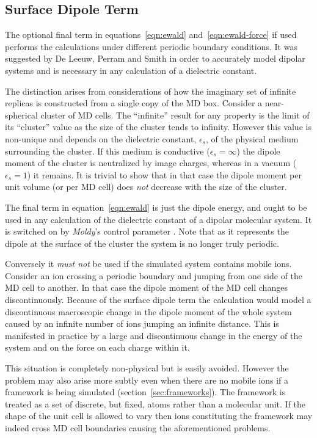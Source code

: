 \documentclass[a4paper,twoside]{report}
\newcommand{\moldy}{\emph{Moldy}}
\begin{document}
\subsection{Surface Dipole Term}
The optional final term in equations~\ref{eqn:ewald} 
and~\ref{eqn:ewald-force} if used performs the calculations under
different periodic boundary conditions.  It was suggested by De Leeuw,
Perram and Smith\cite{deleeuw:80} in order to accurately model
dipolar systems and is necessary in any calculation of a dielectric
constant. 

The distinction arises from considerations of how the imaginary set of
infinite replicas is constructed from a single copy of the MD 
box\cite[pp 156-159]{allen:87}.  Consider a near-spherical cluster
of MD cells.  The ``infinite'' result for any property is the limit of
its ``cluster'' value as the size of the cluster tends to infinity.
However this value is non-unique and depends on the dielectric
constant, $\epsilon_s$, of the physical medium surrounding the cluster.
If this medium is conductive ($\epsilon_s=\infty$) the dipole
moment of the cluster is neutralized by image charges, whereas in a
vacuum ($\epsilon_s=1$) it remains.  It is trivial to show that
in that case the dipole moment per unit volume (or per MD cell) does
\emph{not} decrease with the size of the cluster.

The final term in equation~\ref{eqn:ewald} is just the dipole energy,
and ought to be used in any calculation of the dielectric constant of
a dipolar molecular system.  It is switched on by \moldy's control
parameter .  Note that as it represents the
dipole at the surface of the cluster the system is no longer truly
periodic.

Conversely it \emph{must not} be used if the simulated system contains
mobile ions.  Consider an ion crossing a periodic boundary and jumping
from one side of the MD cell to another.  In that case the dipole
moment of the MD cell changes discontinuously.   Because of the
surface dipole term the calculation would model a discontinuous
macroscopic change in the dipole moment of the whole system caused by
an infinite number of ions jumping an infinite distance.  This is
manifested in practice by a large and discontinuous change in the
energy of the system and on the force on each charge within it.

This situation is completely non-physical but is easily avoided.
However the problem may also arise more subtly even when there are no
mobile ions if a framework is being simulated
(section~\ref{sec:frameworks}).  The framework is treated as a set of
discrete, but fixed, atoms rather than a molecular unit.  If the shape
of the unit cell is allowed to vary then ions constituting the
framework may indeed cross MD cell boundaries causing the
aforementioned problems.
\end{document}
